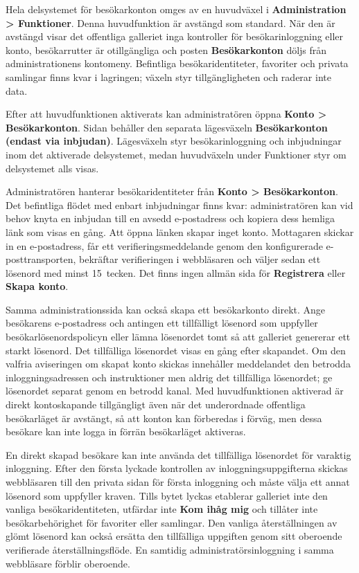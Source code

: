 \documentclass[11pt,a4paper]{article}
\newcommand{\ui}[1]{\textbf{#1}}
\begin{document}
Hela delsystemet för besökarkonton omges av en huvudväxel i \ui{Administration >
Funktioner}. Denna huvudfunktion är avstängd som standard. När den är avstängd
visar det offentliga galleriet inga kontroller för besökarinloggning eller
konto, besökarrutter är otillgängliga och posten \ui{Besökarkonton} döljs från
administrationens kontomeny. Befintliga besökaridentiteter, favoriter och
privata samlingar finns kvar i lagringen; växeln styr tillgängligheten och
raderar inte data.

Efter att huvudfunktionen aktiverats kan administratören öppna \ui{Konto >
Besökarkonton}. Sidan behåller den separata lägesväxeln \ui{Besökarkonton
(endast via inbjudan)}. Lägesväxeln styr besökarinloggning och inbjudningar inom
det aktiverade delsystemet, medan huvudväxeln under Funktioner styr om
delsystemet alls visas.

Administratören hanterar besökaridentiteter från \ui{Konto > Besökarkonton}. Det
befintliga flödet med enbart inbjudningar finns kvar: administratören kan vid
behov knyta en inbjudan till en avsedd e-postadress och kopiera dess hemliga
länk som visas en gång. Att öppna länken skapar inget konto. Mottagaren skickar
in en e-postadress, får ett verifieringsmeddelande genom den konfigurerade
e-posttransporten, bekräftar verifieringen i webbläsaren och väljer sedan ett
lösenord med minst 15~tecken. Det finns ingen allmän sida för \ui{Registrera}
eller \ui{Skapa konto}.

Samma administrationssida kan också skapa ett besökarkonto direkt. Ange
besökarens e-postadress och antingen ett tillfälligt lösenord som uppfyller
besökarlösenordspolicyn eller lämna lösenordet tomt så att galleriet genererar
ett starkt lösenord. Det tillfälliga lösenordet visas en gång efter skapandet.
Om den valfria aviseringen om skapat konto skickas innehåller meddelandet den
betrodda inloggningsadressen och instruktioner men aldrig det tillfälliga
lösenordet; ge lösenordet separat genom en betrodd kanal. Med huvudfunktionen
aktiverad är direkt kontoskapande tillgängligt även när det underordnade
offentliga besökarläget är avstängt, så att konton kan förberedas i förväg, men
dessa besökare kan inte logga in förrän besökarläget aktiveras.

En direkt skapad besökare kan inte använda det tillfälliga lösenordet för
varaktig inloggning. Efter den första lyckade kontrollen av
inloggningsuppgifterna skickas webbläsaren till den privata sidan för första
inloggning och måste välja ett annat lösenord som uppfyller kraven. Tills bytet
lyckas etablerar galleriet inte den vanliga besökaridentiteten, utfärdar inte
\ui{Kom ihåg mig} och tillåter inte besökarbehörighet för favoriter eller
samlingar. Den vanliga återställningen av glömt lösenord kan också ersätta den
tillfälliga uppgiften genom sitt oberoende verifierade återställningsflöde. En
samtidig administratörsinloggning i samma webbläsare förblir oberoende.
\end{document}
